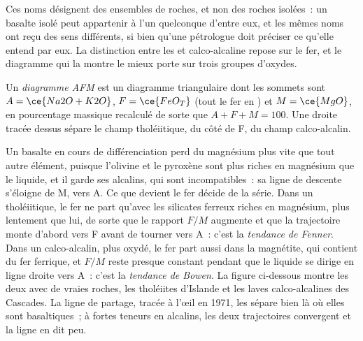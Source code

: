 Ces noms désignent des ensembles de roches, et non des roches isolées~: un basalte isolé peut
appartenir à l'un quelconque d'entre eux, et les mêmes noms ont reçu des sens différents, si bien
qu'une pétrologue doit préciser ce qu'elle entend par eux. La distinction entre les  et calco-alcaline repose sur le fer, et le diagramme qui la montre le mieux porte
sur trois groupes d'oxydes.

\begin{definition}\label{def:b2:magmatic-series:afm}
Un \emph{diagramme AFM} est un diagramme triangulaire dont les sommets sont
$A = \ce{Na2O + K2O}$, $F = \ce{FeO_T}$ (tout le fer en ) et $M = \ce{MgO}$, en
pourcentage massique recalculé de sorte que $A + F + M = 100$. Une droite tracée dessus sépare le
champ tholéiitique, du côté de F, du champ calco-alcalin.
\end{definition}

Un basalte en cours de différenciation perd du magnésium plus vite que tout autre élément,
puisque l'olivine et le pyroxène sont plus riches en magnésium que le liquide, et il garde ses
alcalins, qui sont incompatibles~: sa ligne de descente s'éloigne de M, vers A. Ce que devient le
fer décide de la série. Dans un  tholéiitique, le fer ne part qu'avec les silicates ferreux
riches en magnésium, plus lentement que lui, de sorte que le rapport $F/M$ augmente et que la
trajectoire monte d'abord vers F avant de tourner vers A~: c'est la \emph{tendance de Fenner}.
Dans un  calco-alcalin, plus oxydé, le fer part aussi dans la magnétite, qui contient du fer
ferrique, et $F/M$ reste presque constant pendant que le liquide se dirige en ligne droite vers A~:
c'est la \emph{tendance de Bowen}. La figure ci-dessous montre les deux avec de vraies roches,
les tholéiites d'Islande et les laves calco-alcalines des Cascades. La ligne de partage, tracée à
l'œil en 1971, les sépare bien là où elles sont basaltiques~; à fortes teneurs en alcalins, les deux
trajectoires convergent et la ligne en dit peu.

